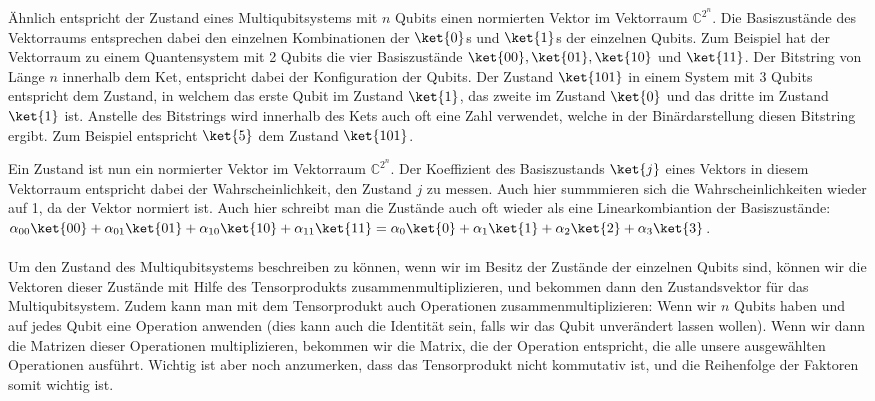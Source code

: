 Ähnlich entspricht der Zustand eines Multiqubitsystems mit $n$ Qubits einen normierten Vektor im Vektorraum $\mathbb{C}^{2^n}$. Die Basiszustände des Vektorraums entsprechen dabei den einzelnen Kombinationen der $\ket{0}$s und $\ket{1}$s der einzelnen Qubits. Zum Beispiel hat der Vektorraum zu einem Quantensystem mit 2 Qubits die vier Basiszustände $\ket{00}, \ket{01}, \ket{10}$ und $\ket{11}$. Der Bitstring von Länge $n$ innerhalb dem Ket, entspricht dabei der Konfiguration der Qubits. Der Zustand $\ket{101}$ in einem System mit 3 Qubits entspricht dem Zustand, in welchem das erste Qubit im Zustand $\ket{1}$, das zweite im Zustand $\ket{0}$ und das dritte im Zustand $\ket{1}$ ist. Anstelle des Bitstrings wird innerhalb des Kets auch oft eine Zahl verwendet, welche in der Binärdarstellung diesen Bitstring ergibt. Zum Beispiel entspricht $\ket{5}$ dem Zustand $\ket{101}$.

Ein Zustand ist nun ein normierter Vektor im Vektorraum $\mathbb{C}^{2^n}$. Der Koeffizient des Basiszustands $\ket{j}$ eines Vektors in diesem Vektorraum entspricht dabei der Wahrscheinlichkeit, den Zustand $j$ zu messen. Auch hier summmieren sich die Wahrscheinlichkeiten wieder auf 1, da der Vektor normiert ist. Auch hier schreibt man die Zustände auch oft wieder als eine Linearkombiantion der Basiszustände: $\alpha_{00}\ket{00} + \alpha_{01}\ket{01} + \alpha_{10}\ket{10} + \alpha_{11}\ket{11} = \alpha_{0}\ket{0} + \alpha_{1}\ket{1} + \alpha_{2}\ket{2} + \alpha_{3}\ket{3}$.

\paragraph{}
Um den Zustand des Multiqubitsystems beschreiben zu können, wenn wir im Besitz der Zustände der einzelnen Qubits sind, können wir die Vektoren dieser Zustände mit Hilfe des Tensorprodukts zusammenmultiplizieren, und bekommen dann den Zustandsvektor für das Multiqubitsystem. Zudem kann man mit dem Tensorprodukt auch Operationen zusammenmultiplizieren: Wenn wir $n$ Qubits haben und auf jedes Qubit eine Operation anwenden (dies kann auch die Identität sein, falls wir das Qubit unverändert lassen wollen). Wenn wir dann die Matrizen dieser Operationen multiplizieren, bekommen wir die Matrix, die der Operation entspricht, die alle unsere ausgewählten Operationen ausführt. Wichtig ist aber noch anzumerken, dass das Tensorprodukt nicht kommutativ ist, und die Reihenfolge der Faktoren somit wichtig ist.
\paragraph{}

